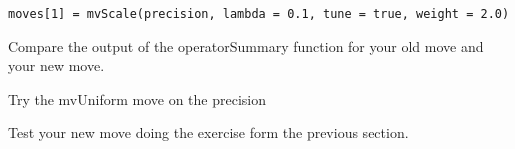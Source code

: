{\tt \begin{snugshade*}
 \begin{lstlisting}
moves[1] = mvScale(precision, lambda = 0.1, tune = true, weight = 2.0)
 \end{lstlisting}
\end{snugshade*}}

Compare the output of the operatorSummary function for your old move and your new move. 

Try the mvUniform move on the precision

Test your new move doing the exercise form the previous section. 
%
%
%
%


